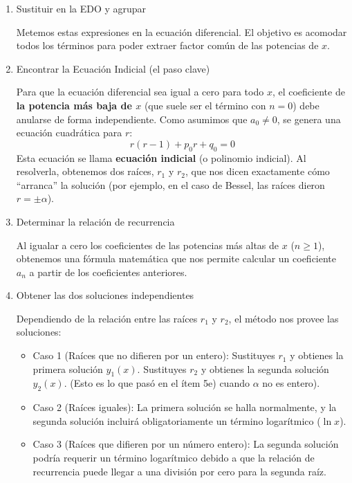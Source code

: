 \documentclass[11pt,spanish]{article}
\begin{document}
\begin{enumerate}
\begin{enumerate}
\item Sustituir en la EDO y agrupar

Metemos estas expresiones en la ecuación diferencial. El objetivo es acomodar todos los términos para poder extraer factor común de las potencias de $x$.

\item Encontrar la Ecuación Indicial (el paso clave)

Para que la ecuación diferencial sea igual a cero para todo $x$, el coeficiente de {\bf la potencia más baja de $x$} (que suele ser el término con $n=0$) debe anularse de forma independiente. Como asumimos que $a_0 \neq 0$, se genera una ecuación cuadrática para $r$:
$$r(r-1) + p_0 r + q_0 = 0$$
Esta ecuación se llama {\bf ecuación indicial} (o polinomio indicial). Al resolverla, obtenemos dos raíces, $r_1$ y $r_2$, que nos dicen exactamente cómo ``arranca'' la solución (por ejemplo, en el caso de Bessel, las raíces dieron $r = \pm\alpha$).

\item Determinar la relación de recurrencia

Al igualar a cero los coeficientes de las potencias más altas de $x$ ($n \ge 1$), obtenemos una fórmula matemática que nos permite calcular un coeficiente $a_n$ a partir de los coeficientes anteriores.

\item Obtener las dos soluciones independientes

Dependiendo de la relación entre las raíces $r_1$ y $r_2$, el método nos provee las soluciones:
\begin{itemize}
\item Caso 1 (Raíces que no difieren por un entero): Sustituyes $r_1$ y obtienes la primera solución $y_1(x)$. Sustituyes $r_2$ y obtienes la segunda solución $y_2(x)$. (Esto es lo que pasó en el ítem 5e) cuando $\alpha$ no es entero).
\item Caso 2 (Raíces iguales): La primera solución se halla normalmente, y la segunda solución incluirá obligatoriamente un término logarítmico ($\ln x$).
\item Caso 3 (Raíces que difieren por un número entero): La segunda solución podría requerir un término logarítmico debido a que la relación de recurrencia puede llegar a una división por cero para la segunda raíz.
\end{itemize}

\end{enumerate}
\end{enumerate}
\end{document}
